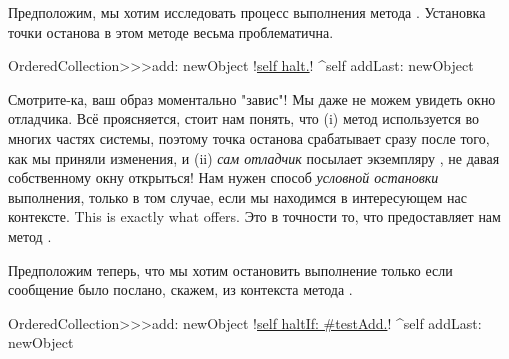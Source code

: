 \documentclass[a4paper,10pt,twoside]{book}
\begin{document}
{%
Предположим, мы хотим исследовать процесс выполнения метода .
Установка точки останова в этом методе весьма проблематична.

\begin{code}{}
OrderedCollection>>>add: newObject
	!\underline{self halt.}!
	^self addLast: newObject
\end{code}

Смотрите-ка, ваш образ моментально "завис"! Мы даже не можем увидеть окно отладчика.
Всё проясняется, стоит нам понять, что (i) метод  используется во многих частях системы, поэтому точка останова срабатывает сразу после того, как мы приняли изменения, и  (ii) \emph{сам отладчик} посылает  экземпляру , не давая собственному окну открыться!
Нам нужен способ \emph{условной остановки} выполнения, только в том случае, если мы находимся в интересующем нас контексте.
This is exactly what  offers.
Это в точности то, что предоставляет нам метод .

Предположим теперь, что мы хотим остановить выполнение только если сообщение  было послано, скажем, из контекста метода .

\begin{code}{}
OrderedCollection>>>add: newObject
	!\underline{self haltIf: \#testAdd.}!
	^self addLast: newObject
\end{code}

}
\end{document}
